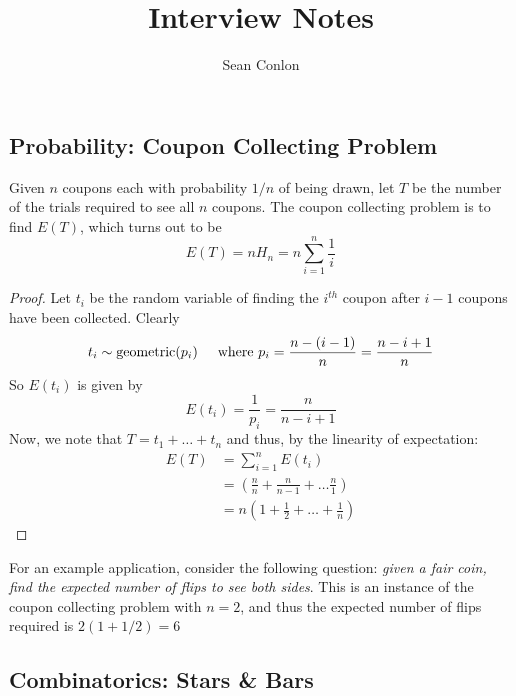 \documentclass{article}
\title{Interview Notes}
\author{Sean Conlon}
\begin{document}
\maketitle

\newpage
\subsection*{Probability: Coupon Collecting Problem}
Given $n$ coupons each with probability $1/n$ of being drawn, let $T$ be the number of the trials required to see all $n$ coupons. The coupon collecting problem is to find $E(T)$, which turns out to be 
$$E(T) = n H_n = n \sum_{i=1}^{n}\frac{1}{i}$$
\begin{proof}
    Let $t_i$ be the random variable of finding the $i^{th}$ coupon after $i-1$ coupons have been collected. Clearly
    $$t_i \sim \text{geometric}(p_i) \hspace{5mm} \text{where } p_i = \frac{n-(i-1)}{n} = \frac{n-i+1}{n}$$
    So $E(t_i)$ is given by 
    $$E(t_i) = \frac{1}{p_i} = \frac{n}{n-i+1}$$
    Now, we note that $T = t_1 + \dots + t_n$ and thus, by the linearity of expectation: 
    \begin{align*}
        E(T) &= \sum_{i=1}^{n}E(t_i) \\
        &= \left(\frac{n}{n} + \frac{n}{n-1} + \dots \frac{n}{1} \right) \\
        &= n\left(1 + \frac{1}{2} + \dots + \frac{1}{n} \right)
    \end{align*}
\end{proof}
For an example application, consider the following question: \textit{given a fair coin, find the expected number of flips to see both sides}. This is an instance of the coupon collecting problem with $n=2$, and thus the expected number of flips required is $2(1+1/2) = 6$


\subsection*{Combinatorics: Stars \& Bars}
\end{document}
